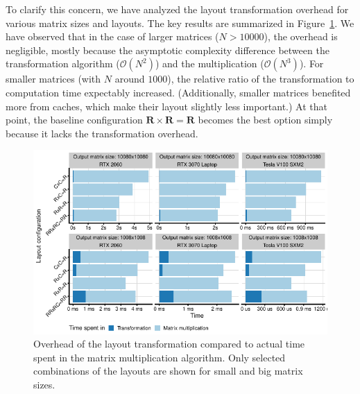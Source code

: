 

To clarify this concern, we have analyzed the layout transformation overhead for various matrix sizes and layouts. The key results are summarized in Figure~\ref{fig:matmul_comp}. We have observed that in the case of larger matrices ($N>10000$), the overhead is negligible, mostly because the asymptotic complexity difference between the transformation algorithm ($\mathcal{O}(N^2)$) and the multiplication ($\mathcal{O}(N^3)$). For smaller matrices (with $N$ around $1000$), the relative ratio of the transformation to computation time expectably increased. (Additionally, smaller matrices benefited more from caches, which make their layout slightly less important.) At that point, the baseline configuration $\textbf{R}\times\textbf{R}=\textbf{R}$ becomes the best option simply because it lacks the transformation overhead.

\begin{figure}
	\centering
	\includegraphics{plots/matmul_transform.pdf}
	\caption{Overhead of the layout transformation compared to actual time spent in the matrix multiplication algorithm. Only selected combinations of the layouts are shown for small and big matrix sizes.}
	\label{fig:matmul_comp}
\end{figure}

